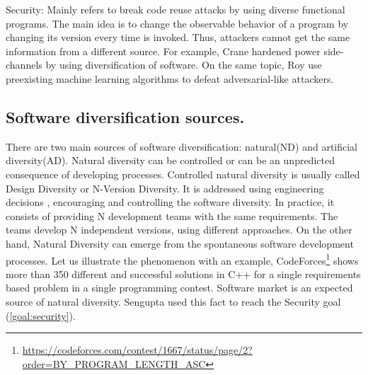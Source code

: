 \begin{goal}{Security:}
    \label{goal:security}    
    \normalfont
    Mainly refers to break code reuse attacks \cite{595185} by using diverse functional programs. The main idea is to change the observable behavior of a program by changing its version every time is invoked. Thus, attackers cannot get the same information from a different source. For example, Crane \etal \cite{crane2015thwarting} hardened power side-channels by using diversification of software. On the same topic, Roy \etal \cite{10.1145/3318216.3363338} use preexisting machine learning algorithms to defeat adversarial-like attackers.
\end{goal} 







\subsection*{Software diversification sources.}

There are two main sources of software diversification: natural(ND) and artificial diversity(AD). Natural diversity can be controlled or can be an unpredicted consequence of developing processes. Controlled natural diversity is usually called Design Diversity or N-Version Diversity. It is addressed using engineering decisions \cite{1659219}, encouraging and controlling the software diversity. In practice, it consists of providing N development teams with the same requirements. The teams develop N independent versions, using different approaches. On the other hand, Natural Diversity can emerge from the spontaneous software development processes. Let us illustrate the phenomenon with an example, CodeForces\footnote{\url{https://codeforces.com/contest/1667/status/page/2?order=BY_PROGRAM_LENGTH_ASC}} shows more than 350 different and successful solutions in C++ for a single requirements based problem in a single programming contest. 
Software market is an expected source of natural diversity. Sengupta \etal \cite{10.5555/3091125.3091155} used this fact to reach the Security goal (\autoref{goal:security}).


